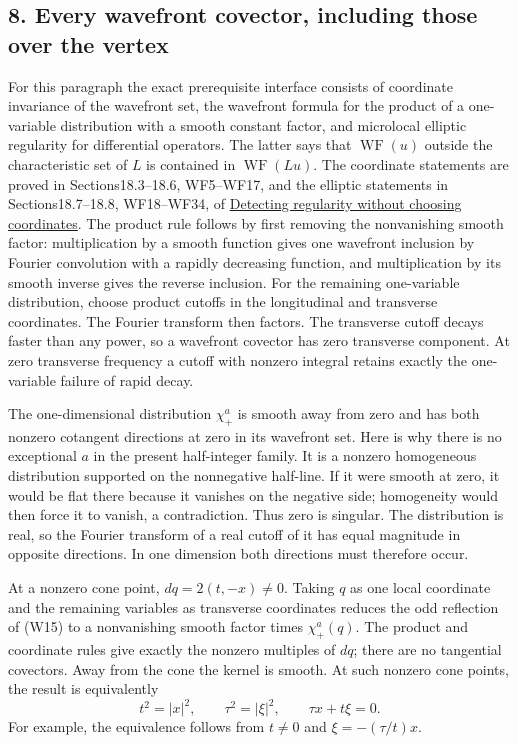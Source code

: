 \documentclass[
  11pt,
]{article}
\begin{document}
\subsection{8. Every wavefront covector, including those over the
vertex}\label{every-wavefront-covector-including-those-over-the-vertex}

For this paragraph the exact prerequisite interface consists of
coordinate invariance of the wavefront set, the wavefront formula for
the product of a one-variable distribution with a smooth constant
factor, and microlocal elliptic regularity for differential operators.
The latter says that \(\operatorname{WF}(u)\) outside the characteristic
set of \(L\) is contained in \(\operatorname{WF}(Lu)\). The coordinate
statements are proved in Sections18.3--18.6, WF5--WF17, and the elliptic
statements in Sections18.7--18.8, WF18--WF34, of
\href{geometric-microlocal-calculus.pdf}{Detecting regularity without
choosing coordinates}. The product rule follows by first removing the
nonvanishing smooth factor: multiplication by a smooth function gives
one wavefront inclusion by Fourier convolution with a rapidly decreasing
function, and multiplication by its smooth inverse gives the reverse
inclusion. For the remaining one-variable distribution, choose product
cutoffs in the longitudinal and transverse coordinates. The Fourier
transform then factors. The transverse cutoff decays faster than any
power, so a wavefront covector has zero transverse component. At zero
transverse frequency a cutoff with nonzero integral retains exactly the
one-variable failure of rapid decay.

The one-dimensional distribution \(\chi_+^a\) is smooth away from zero
and has both nonzero cotangent directions at zero in its wavefront set.
Here is why there is no exceptional \(a\) in the present half-integer
family. It is a nonzero homogeneous distribution supported on the
nonnegative half-line. If it were smooth at zero, it would be flat there
because it vanishes on the negative side; homogeneity would then force
it to vanish, a contradiction. Thus zero is singular. The distribution
is real, so the Fourier transform of a real cutoff of it has equal
magnitude in opposite directions. In one dimension both directions must
therefore occur.

At a nonzero cone point, \(dq=2(t,-x)\ne0\). Taking \(q\) as one local
coordinate and the remaining variables as transverse coordinates reduces
the odd reflection of (W15) to a nonvanishing smooth factor times
\(\chi_+^a(q)\). The product and coordinate rules give exactly the
nonzero multiples of \(dq\); there are no tangential covectors. Away
from the cone the kernel is smooth. At such nonzero cone points, the
result is equivalently \[
 t^2=|x|^2,\qquad \tau^2=|\xi|^2,\qquad
                  \tau x+t\xi=0.
 \tag{OE20}
\] For example, the equivalence follows from \(t\ne0\) and
\(\xi=-(\tau/t)x\).
\end{document}
